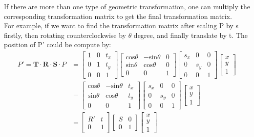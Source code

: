 \begin{tcolorbox}
If there are more than one type of geometric transformation, one can multiply the corresponding transformation matrix to get the final transformation matrix. \\
For example, if we want to find the transformation matrix after scaling P by s firstly, then rotating counterclockwise by $\theta$ degree, and finally translate by t. The position of P' could be compute by:
\begin{align*}
    P'= \textbf{T} \cdot \textbf{R} \cdot \textbf{S} \cdot P &=  \left[\begin{array}{rrr} 1 & 0 & t_x\\ 0 & 1 & t_y\\ 0 & 0 & 1 \end{array}\right]\left[\begin{array}{ccc} \text{cos}\theta & -\text{sin}\theta & 0 \\ \text{sin}\theta & \text{cos}\theta & 0 \\ 0 & 0 & 1 \end{array}\right]\left[\begin{array}{ccc} s_x & 0 & 0 \\ 0 & s_y & 0 \\ 0 & 0 & 1 \end{array}\right] \left[\begin{array}{r}x\\ y\\ 1 \end{array}\right] \\
    &= \left[\begin{array}{ccc} \text{cos}\theta & -\text{sin}\theta & t_x \\ \text{sin}\theta & \text{cos}\theta & t_y \\ 0 & 0 & 1 \end{array}\right]\left[\begin{array}{ccc} s_x & 0 & 0 \\ 0 & s_y & 0 \\ 0 & 0 & 1 \end{array}\right] \left[\begin{array}{r}x\\ y\\ 1 \end{array}\right]  \\
    &= \left[\begin{array}{cc} R' & t \\ 0 & 1 \end{array}\right]\left[\begin{array}{cc} S & 0 \\ 0 & 1 \end{array}\right] \left[\begin{array}{r}x\\ y\\ 1 \end{array}\right] \\

\end{align*}
\end{tcolorbox}
